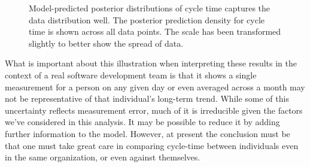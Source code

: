 \documentclass[
]{article}
\begin{document}
\begin{figure}


\caption[Model-predicted posterior distributions of cycle time captures
the data distribution well]{\label{fig-pp-check-sum}Model-predicted
posterior distributions of cycle time captures the data distribution
well. The posterior prediction density for cycle time is shown across
all data points. The scale has been transformed slightly to better show
the spread of data.}

\end{figure}%

What is important about this illustration when interpreting these
results in the context of a real software development team is that it
shows a single measurement for a person on any given day or even
averaged across a month may not be representative of that individual's
long-term trend. While some of this uncertainty reflects measurement
error, much of it is irreducible given the factors we've considered in
this analysis. It may be possible to reduce it by adding further
information to the model. However, at present the conclusion must be
that one must take great care in comparing cycle-time between
individuals even in the same organization, or even against themselves.
\end{document}
